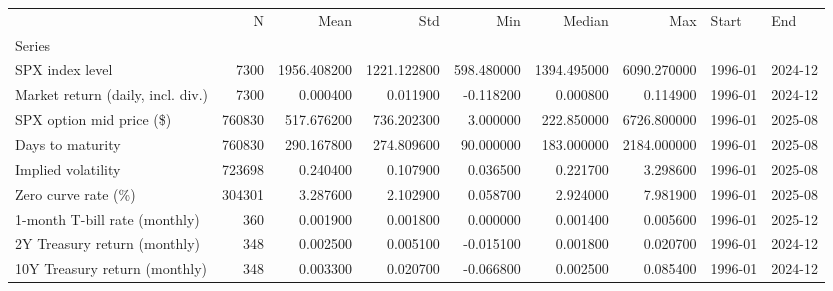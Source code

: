 \begin{tabular}{lrrrrrrll}
\toprule
 & N & Mean & Std & Min & Median & Max & Start & End \\
Series &  &  &  &  &  &  &  &  \\
\midrule
SPX index level & 7300 & 1956.408200 & 1221.122800 & 598.480000 & 1394.495000 & 6090.270000 & 1996-01 & 2024-12 \\
Market return (daily, incl. div.) & 7300 & 0.000400 & 0.011900 & -0.118200 & 0.000800 & 0.114900 & 1996-01 & 2024-12 \\
SPX option mid price (\$) & 760830 & 517.676200 & 736.202300 & 3.000000 & 222.850000 & 6726.800000 & 1996-01 & 2025-08 \\
Days to maturity & 760830 & 290.167800 & 274.809600 & 90.000000 & 183.000000 & 2184.000000 & 1996-01 & 2025-08 \\
Implied volatility & 723698 & 0.240400 & 0.107900 & 0.036500 & 0.221700 & 3.298600 & 1996-01 & 2025-08 \\
Zero curve rate (\%) & 304301 & 3.287600 & 2.102900 & 0.058700 & 2.924000 & 7.981900 & 1996-01 & 2025-08 \\
1-month T-bill rate (monthly) & 360 & 0.001900 & 0.001800 & 0.000000 & 0.001400 & 0.005600 & 1996-01 & 2025-12 \\
2Y Treasury return (monthly) & 348 & 0.002500 & 0.005100 & -0.015100 & 0.001800 & 0.020700 & 1996-01 & 2024-12 \\
10Y Treasury return (monthly) & 348 & 0.003300 & 0.020700 & -0.066800 & 0.002500 & 0.085400 & 1996-01 & 2024-12 \\
\bottomrule
\end{tabular}
